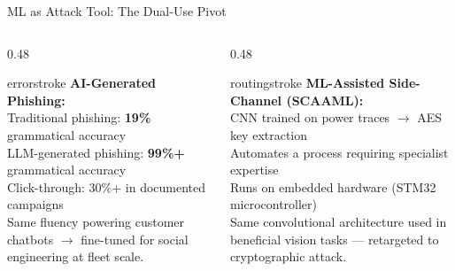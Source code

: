 \documentclass[aspectratio=169, 12pt]{beamer}
\begin{document}
\begin{frame}{ML as Attack Tool: The Dual-Use Pivot}
\footnotesize
\begin{columns}[T]
  \begin{column}{0.48\textwidth}
    \begin{mlsyscard}{errorstroke}
    \textbf{AI-Generated Phishing:}\\[0.05cm]
    {\scriptsize
    Traditional phishing: \textbf{19\%} grammatical accuracy\\
    LLM-generated phishing: \textbf{99\%+} grammatical accuracy\\
    Click-through: 30\%+ in documented campaigns\\[0.05cm]
    Same fluency powering customer chatbots $\to$
    fine-tuned for social engineering at fleet scale.}
    \end{mlsyscard}
  \end{column}
  \begin{column}{0.48\textwidth}
    \begin{mlsyscard}{routingstroke}
    \textbf{ML-Assisted Side-Channel (SCAAML):}\\[0.05cm]
    {\scriptsize
    CNN trained on power traces $\to$ AES key extraction\\
    Automates a process requiring specialist expertise\\
    Runs on embedded hardware (STM32 microcontroller)\\[0.05cm]
    Same convolutional architecture used in beneficial
    vision tasks --- retargeted to cryptographic attack.}
    \end{mlsyscard}
  \end{column}
\end{columns}

\vspace{0.1cm}
\small
{}

\end{frame}
\end{document}
